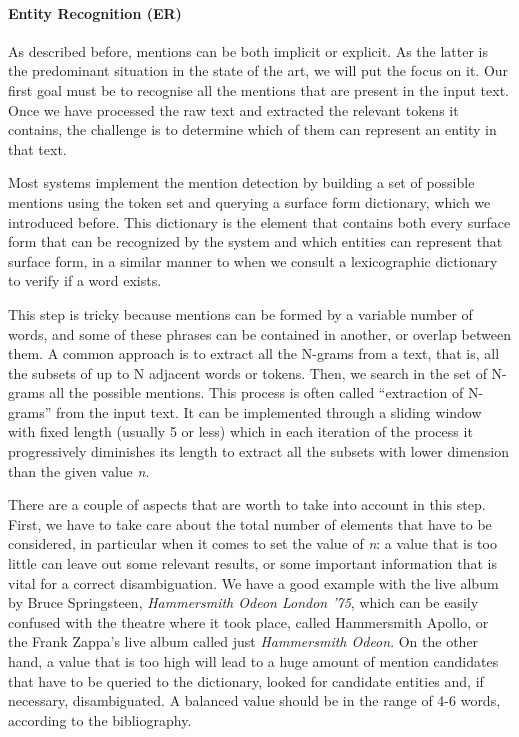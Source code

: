 \paragraph{Entity Recognition (ER)}

As described before, mentions can be both implicit or explicit. As the latter is the predominant situation in the state of the art, we will put the focus on it. Our first goal must be to recognise all the mentions that are present in the input text. Once we have processed the raw text and extracted the relevant tokens it contains, the challenge is to determine which of them can represent an entity in that text.

Most systems implement the mention detection by building a set of possible mentions using the token set and querying a surface form dictionary, which we introduced before. This dictionary is the element that contains both every surface form that can be recognized by the system and which entities can represent that surface form, in a similar manner to when we consult a lexicographic dictionary to verify if a word exists.

This step is tricky because mentions can be formed by a variable number of words, and some of these phrases can be contained in another, or overlap between them. A common approach is to extract all the N-grams from a text, that is, all the subsets of up to N adjacent words or tokens. Then, we search in the set of N-grams all the possible mentions. This process is often called ``extraction of N-grams'' from the input text. It can be implemented through a sliding window with fixed length (usually 5 or less) which in each iteration of the process it progressively diminishes its length to extract all the subsets with lower dimension than the given value \textit{n}.

There are a couple of aspects that are worth to take into account in this step. First, we have to take care about the total number of elements that have to be considered, in particular when it comes to set the value of \textit{n}: a value that is too little can leave out some relevant results, or some important information that is vital for a correct disambiguation. We have a good example with the live album by Bruce Springsteen, \textit{Hammersmith Odeon London '75}, which can be easily confused with the theatre where it took place, called Hammersmith Apollo, or the Frank Zappa's live album called just \textit{Hammersmith Odeon}. On the other hand, a value that is too high will lead to a huge amount of mention candidates that have to be queried to the dictionary, looked for candidate entities and, if necessary, disambiguated. A balanced value should be in the range of 4-6 words, according to the bibliography.

